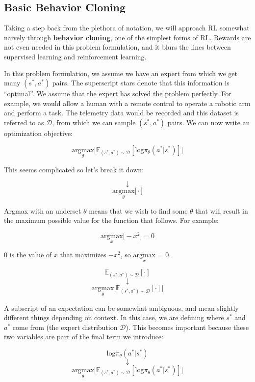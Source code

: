 \subsection{Basic Behavior Cloning}
\begin{flushleft}
    \large Taking a step back from the plethora of notation, we will approach RL somewhat naively through \textbf{behavior cloning}, one of the simplest forms of RL. Rewards are not even needed in this problem formulation, and it blurs the lines between supervised learning and reinforcement learning. \break

    In this problem formulation, we assume we have an expert from which we get many $(s^*, a^*)$ pairs. The superscript stars denote that this information is ``optimal''. We assume that the expert has solved the problem perfectly. For example, we would allow a human with a remote control to operate a robotic arm and perform a task. The telemetry data would be recorded and this dataset is referred to as $\mathcal{D}$, from which we can sample $(s^*, a^*)$ pairs. We can now write an optimization objective:

    $$\underset{\theta}{\textrm{argmax}}\biggl[\mathbb{E}_{(s^*,a^*) \sim \mathcal{D}}[\mathrm{log}\pi_\theta(a^*|s^*)]\biggr]$$

    This seems complicated so let's break it down:

    $$\downarrow$$
    $$\underset{\theta}{\textrm{argmax}}\biggl[ \cdot \biggr]$$

    Argmax with an underset $\theta$ means that we wish to find some $\theta$ that will result in the maximum possible value for the function that follows. For example:

    $$\underset{x}{\textrm{argmax}}\biggl[-x^2\biggr] = 0$$

    0 is the value of $x$ that maximizes $-x^2$, so $\underset{x}{\textrm{argmax}}$ = 0.
    
    $$\mathbb{E}_{(s^*,a^*) \sim \mathcal{D}}[\cdot]$$
    $$\downarrow$$
    $$\underset{\theta}{\textrm{argmax}}\biggl[ \mathbb{E}_{(s^*,a^*) \sim \mathcal{D}}[\cdot] \biggr]$$

   A subscript of an expectation can be somewhat ambiguous, and mean slightly different things depending on context. In this case, we are defining where $s^*$ and $a^*$ come from (the expert distribution $\mathcal{D}$). This becomes important because these two variables are part of the final term we introduce:

   $$\mathrm{log}\pi_\theta(a^*|s^*)$$
   $$\downarrow$$
   $$\underset{\theta}{\textrm{argmax}}\biggl[\mathbb{E}_{(s^*,a^*) \sim \mathcal{D}}[\mathrm{log}\pi_\theta(a^*|s^*)]\biggr]$$


\end{flushleft}
